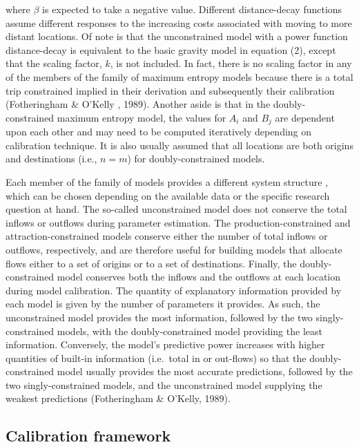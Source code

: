 \documentclass[11pt]{article}
\begin{document}
where \(\beta\) is expected to take a negative value. Different
distance-decay functions assume different responses to the increasing
costs associated with moving to more distant locations. Of note is that
the unconstrained model with a power function distance-decay is
equivalent to the basic gravity model in equation (2), except that the
scaling factor, \(k\), is not included. In fact, there is no scaling
factor in any of the members of the family of maximum entropy models
because there is a total trip constrained implied in their derivation
and subsequently their calibration (Fotheringham \& O'Kelly , 1989).
Another aside is that in the doubly-constrained maximum entropy model,
the values for \(A_{i}\) and \(B_{j}\) are dependent upon each other and
may need to be computed iteratively depending on calibration technique.
It is also usually assumed that all locations are both origins and
destinations (i.e., \(n=m\)) for doubly-constrained models.

Each member of the family of models provides a different system
structure , which can be chosen depending on the available data or the
specific research question at hand. The so-called unconstrained model
does not conserve the total inflows or outflows during parameter
estimation. The production-constrained and attraction-constrained models
conserve either the number of total inflows or outflows, respectively,
and are therefore useful for building models that allocate flows either
to a set of origins or to a set of destinations. Finally, the
doubly-constrained model conserves both the inflows and the outflows at
each location during model calibration. The quantity of explanatory
information provided by each model is given by the number of parameters
it provides. As such, the unconstrained model provides the most
information, followed by the two singly-constrained models, with the
doubly-constrained model providing the least information. Conversely,
the model's predictive power increases with higher quantities of
built-in information (i.e.~total in or out-flows) so that the
doubly-constrained model usually provides the most accurate predictions,
followed by the two singly-constrained models, and the unconstrained
model supplying the weakest predictions (Fotheringham \& O'Kelly, 1989).

    \subsection{Calibration framework}\label{calibration-framework}
\end{document}
